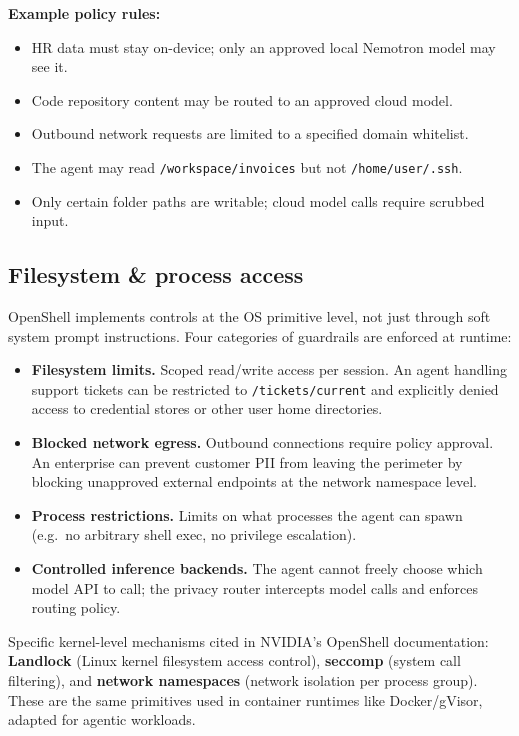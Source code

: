 \textbf{Example policy rules:}
\begin{itemize}
  \item HR data must stay on-device; only an approved local Nemotron model may see it.
  \item Code repository content may be routed to an approved cloud model.
  \item Outbound network requests are limited to a specified domain whitelist.
  \item The agent may read \texttt{/workspace/invoices} but not \texttt{/home/user/.ssh}.
  \item Only certain folder paths are writable; cloud model calls require scrubbed input.
\end{itemize}

\subsection{Filesystem \& process access}

OpenShell implements controls at the OS primitive level, not just through soft system
prompt instructions. Four categories of guardrails are enforced at runtime:

\begin{itemize}
  \item \textbf{Filesystem limits.} Scoped read/write access per session. An agent
    handling support tickets can be restricted to \texttt{/tickets/current} and
    explicitly denied access to credential stores or other user home directories.

  \item \textbf{Blocked network egress.} Outbound connections require policy approval.
    An enterprise can prevent customer PII from leaving the perimeter by blocking
    unapproved external endpoints at the network namespace level.

  \item \textbf{Process restrictions.} Limits on what processes the agent can spawn
    (e.g.\ no arbitrary shell exec, no privilege escalation).

  \item \textbf{Controlled inference backends.} The agent cannot freely choose which
    model API to call; the privacy router intercepts model calls and enforces
    routing policy.
\end{itemize}

Specific kernel-level mechanisms cited in NVIDIA's OpenShell documentation:
\textbf{Landlock} (Linux kernel filesystem access control), \textbf{seccomp}
(system call filtering), and \textbf{network namespaces} (network isolation per
process group). These are the same primitives used in container runtimes like
Docker/gVisor, adapted for agentic workloads.

